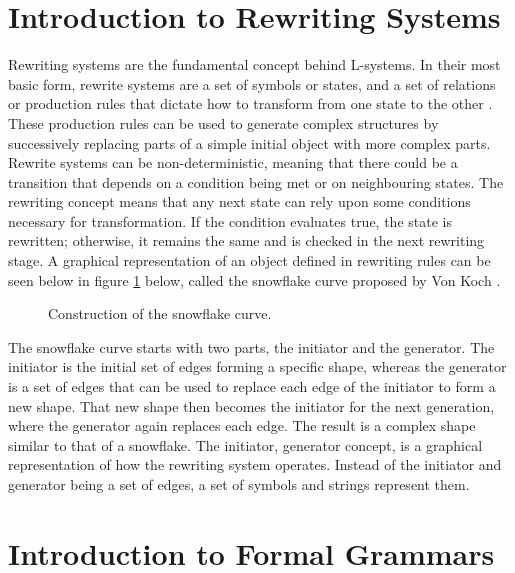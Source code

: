 \section{Introduction to Rewriting Systems}

Rewriting systems are the fundamental concept behind L-systems. In their most basic form, rewrite systems are a set of symbols or states, and a set of relations or production rules that dictate how to transform from one state to the other \cite{prusinkiewicz2012algorithmic}. These production rules can be used to generate complex structures by successively replacing parts of a simple initial object with more complex parts. Rewrite systems can be non-deterministic, meaning that there could be a transition that depends on a condition being met or on neighbouring states. The rewriting concept means that any next state can rely upon some conditions necessary for transformation. If the condition evaluates true, the state is rewritten; otherwise, it remains the same and is checked in the next rewriting stage. A graphical representation of an object defined in rewriting rules can be seen below in figure \ref{snowflake curve} below, called the snowflake curve proposed by Von Koch \cite{koch1906methode}.

\begin{figure}[htbp]
	{\centering
		\setlength{\fboxrule}{1pt}
		\vspace{7px}
		\caption{Construction of the snowflake curve\cite{prusinkiewicz2013lindenmayer}.} \label{snowflake curve}
	}
\end{figure}
\FloatBarrier

\noindent
The snowflake curve starts with two parts, the initiator and the generator. The initiator is the initial set of edges forming a specific shape, whereas the generator is a set of edges that can be used to replace each edge of the initiator to form a new shape. That new shape then becomes the initiator for the next generation, where the generator again replaces each edge. The result is a complex shape similar to that of a snowflake. The initiator, generator concept, is a graphical representation of how the rewriting system operates. Instead of the initiator and generator being a set of edges, a set of symbols and strings represent them.

\section{Introduction to Formal Grammars}

